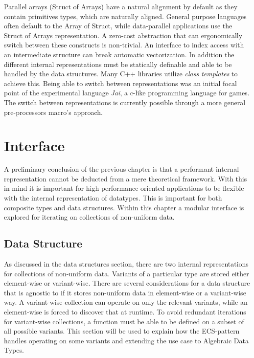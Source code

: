 \documentclass{article}
\begin{document}
Parallel arrays (Struct of Arrays) have a natural alignment by default as they contain primitives types, which are naturally aligned.
General purpose languages often default to the Array of Struct, while data-parallel applications use the Struct of Arrays representation.
A zero-cost abstraction that can ergonomically switch between these constructs is non-trivial.
An interface to index access with an intermediate structure can break automatic vectorization\cite{abstraction-vectorization}. 
In addition the different internal representations must be statically definable and able to be handled by the data structures.
Many C++ libraries utilize {\it class templates} to achieve this\cite{abstraction-vectorization}.
Being able to switch between representations was an initial focal point of the experimental language {\it Jai}, a c-like programming language for games.
The switch between representations is currently possible through a more general pre-processors macro's approach.

\newpage

\section{Interface}

A preliminary conclusion of the previous chapter is that a performant internal representation cannot be deducted from a mere theoretical framework.
With this in mind it is important for high performance oriented applications to be flexible with the internal representation of datatypes.
This is important for both composite types and data structures.
Within this chapter a modular interface is explored for iterating on collections of non-uniform data.

\subsection{Data Structure}

As discussed in the data structures section, there are two internal representations for collections of non-uniform data.
Variants of a particular type are stored either element-wise or variant-wise.
There are several considerations for a data structure that is agnostic to if it stores non-uniform data in element-wise or a variant-wise way.
A variant-wise collection can operate on only the relevant variants, while an element-wise is forced to discover that at runtime.
To avoid redundant iterations for variant-wise collections, a function must be able to be defined on a subset of all possible variants.
This section will be used to explain how the ECS-pattern handles operating on some variants and extending the use case to Algebraic Data Types.
\end{document}
